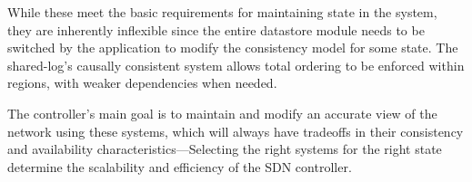 \documentclass[letterpaper,twocolumn,10pt]{article}
\begin{document}
While these meet the basic requirements for maintaining state in the system, they are inherently inflexible since the entire datastore module needs to be switched by the application to modify the consistency model for some state. The shared-log's causally consistent system allows total ordering to be enforced within regions, with weaker dependencies when needed. 

The controller's main goal is to maintain and modify an accurate view of the network using these systems, which will always have tradeoffs in their consistency and availability characteristics---Selecting the right systems for the right state determine the scalability and efficiency of the SDN controller.





\end{document}
